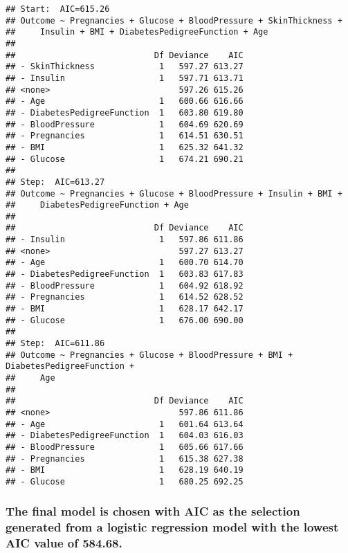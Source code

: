 \documentclass[
]{article}
\begin{document}
\begin{verbatim}
## Start:  AIC=615.26
## Outcome ~ Pregnancies + Glucose + BloodPressure + SkinThickness + 
##     Insulin + BMI + DiabetesPedigreeFunction + Age
## 
##                            Df Deviance    AIC
## - SkinThickness             1   597.27 613.27
## - Insulin                   1   597.71 613.71
## <none>                          597.26 615.26
## - Age                       1   600.66 616.66
## - DiabetesPedigreeFunction  1   603.80 619.80
## - BloodPressure             1   604.69 620.69
## - Pregnancies               1   614.51 630.51
## - BMI                       1   625.32 641.32
## - Glucose                   1   674.21 690.21
## 
## Step:  AIC=613.27
## Outcome ~ Pregnancies + Glucose + BloodPressure + Insulin + BMI + 
##     DiabetesPedigreeFunction + Age
## 
##                            Df Deviance    AIC
## - Insulin                   1   597.86 611.86
## <none>                          597.27 613.27
## - Age                       1   600.70 614.70
## - DiabetesPedigreeFunction  1   603.83 617.83
## - BloodPressure             1   604.92 618.92
## - Pregnancies               1   614.52 628.52
## - BMI                       1   628.17 642.17
## - Glucose                   1   676.00 690.00
## 
## Step:  AIC=611.86
## Outcome ~ Pregnancies + Glucose + BloodPressure + BMI + DiabetesPedigreeFunction + 
##     Age
## 
##                            Df Deviance    AIC
## <none>                          597.86 611.86
## - Age                       1   601.64 613.64
## - DiabetesPedigreeFunction  1   604.03 616.03
## - BloodPressure             1   605.66 617.66
## - Pregnancies               1   615.38 627.38
## - BMI                       1   628.19 640.19
## - Glucose                   1   680.25 692.25
\end{verbatim}

\hypertarget{the-final-model-is-chosen-with-aic-as-the-selection-generated-from-a-logistic-regression-model-with-the-lowest-aic-value-of-584.68.}{%
\subsubsection{\texorpdfstring{\textbf{The final model is chosen with
AIC as the selection generated from a logistic regression model with the
lowest AIC value of
584.68.}}{The final model is chosen with AIC as the selection generated from a logistic regression model with the lowest AIC value of 584.68.}}\label{the-final-model-is-chosen-with-aic-as-the-selection-generated-from-a-logistic-regression-model-with-the-lowest-aic-value-of-584.68.}}
\end{document}
